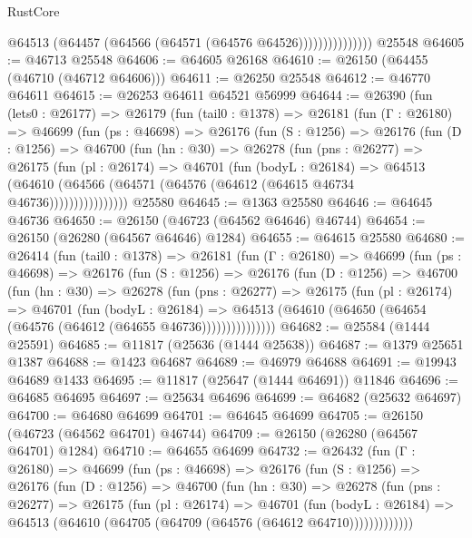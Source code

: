 \begin{lexlean}{RustCore}
\begin{coremodule}
                        @64513 (@64457 (@64566 (@64571 (@64576 @64526)))))))))))))))
    @25548
@64605 := @46713 @25548
@64606 := @64605 @26168
@64610 := @26150 (@64455 (@46710 (@46712 @64606)))
@64611 := @26250 @25548
@64612 := @46770 @64611
@64615 := @26253 @64611 @64521 @56999
@64644 := @26390
    (fun (lets0 : @26177) =>
    @26179
      (fun (tail0 : @1378) =>
      @26181
        (fun (Γ : @26180) =>
        @46699
          (fun (ps : @46698) =>
          @26176
            (fun (S : @1256) =>
            @26176
              (fun (D : @1256) =>
              @46700
                (fun (hn : @30) =>
                @26278
                  (fun (pns : @26277) =>
                  @26175
                    (fun (pl : @26174) =>
                    @46701
                      (fun (bodyL : @26184) =>
                      @64513
                        (@64610
                          (@64566 (@64571 (@64576 (@64612 (@64615 @46734 @46736))))))))))))))))
    @25580
@64645 := @1363 @25580
@64646 := @64645 @46736
@64650 := @26150 (@46723 (@64562 @64646) @46744)
@64654 := @26150 (@26280 (@64567 @64646) @1284)
@64655 := @64615 @25580
@64680 := @26414
    (fun (tail0 : @1378) =>
    @26181
      (fun (Γ : @26180) =>
      @46699
        (fun (ps : @46698) =>
        @26176
          (fun (S : @1256) =>
          @26176
            (fun (D : @1256) =>
            @46700
              (fun (hn : @30) =>
              @26278
                (fun (pns : @26277) =>
                @26175
                  (fun (pl : @26174) =>
                  @46701
                    (fun (bodyL : @26184) =>
                    @64513 (@64610 (@64650 (@64654 (@64576 (@64612 (@64655 @46736)))))))))))))))
@64682 := @25584 (@1444 @25591)
@64685 := @11817 (@25636 (@1444 @25638))
@64687 := @1379 @25651 @1387
@64688 := @1423 @64687
@64689 := @46979 @64688
@64691 := @19943 @64689 @1433
@64695 := @11817 (@25647 (@1444 @64691)) @11846
@64696 := @64685 @64695
@64697 := @25634 @64696
@64699 := @64682 (@25632 @64697)
@64700 := @64680 @64699
@64701 := @64645 @64699
@64705 := @26150 (@46723 (@64562 @64701) @46744)
@64709 := @26150 (@26280 (@64567 @64701) @1284)
@64710 := @64655 @64699
@64732 := @26432
    (fun (Γ : @26180) =>
    @46699
      (fun (ps : @46698) =>
      @26176
        (fun (S : @1256) =>
        @26176
          (fun (D : @1256) =>
          @46700
            (fun (hn : @30) =>
            @26278
              (fun (pns : @26277) =>
              @26175
                (fun (pl : @26174) =>
                @46701
                  (fun (bodyL : @26184) =>
                  @64513 (@64610 (@64705 (@64709 (@64576 (@64612 @64710)))))))))))))

\end{coremodule}
\end{lexlean}
